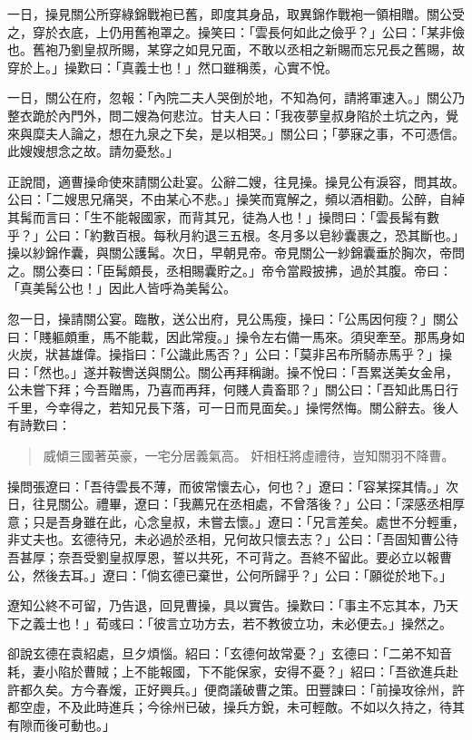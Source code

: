 一日，操見關公所穿綠錦戰袍已舊，即度其身品，取異錦作戰袍一領相贈。關公受之，穿於衣底，上仍用舊袍罩之。操笑曰：「雲長何如此之儉乎？」公曰：「某非儉也。舊袍乃劉皇叔所賜，某穿之如見兄面，不敢以丞相之新賜而忘兄長之舊賜，故穿於上。」操歎曰：「真義士也！」然口雖稱羨，心實不悅。

一日，關公在府，忽報：「內院二夫人哭倒於地，不知為何，請將軍速入。」關公乃整衣跪於內門外，問二嫂為何悲泣。甘夫人曰：「我夜夢皇叔身陷於土坑之內，覺來與糜夫人論之，想在九泉之下矣，是以相哭。」關公曰；「夢寐之事，不可憑信。此嫂嫂想念之故。請勿憂愁。」

正說間，適曹操命使來請關公赴宴。公辭二嫂，往見操。操見公有淚容，問其故。公曰：「二嫂思兄痛哭，不由某心不悲。」操笑而寬解之，頻以酒相勸。公醉，自綽其髯而言曰：「生不能報國家，而背其兄，徒為人也！」操問曰：「雲長髯有數乎？」公曰：「約數百根。每秋月約退三五根。冬月多以皂紗囊裹之，恐其斷也。」操以紗錦作囊，與關公護髯。次日，早朝見帝。帝見關公一紗錦囊垂於胸次，帝問之。關公奏曰：「臣髯頗長，丞相賜囊貯之。」帝令當殿披拂，過於其腹。帝曰：「真美髯公也！」因此人皆呼為美髯公。

忽一日，操請關公宴。臨散，送公出府，見公馬瘦，操曰：「公馬因何瘦？」關公曰：「賤軀頗重，馬不能載，因此常瘦。」操令左右備一馬來。須臾牽至。那馬身如火炭，狀甚雄偉。操指曰：「公識此馬否？」公曰：「莫非呂布所騎赤馬乎？」操曰：「然也。」遂并鞍轡送與關公。關公再拜稱謝。操不悅曰：「吾累送美女金帛，公未嘗下拜；今吾贈馬，乃喜而再拜，何賤人貴畜耶？」關公曰：「吾知此馬日行千里，今幸得之，若知兄長下落，可一日而見面矣。」操愕然悔。關公辭去。後人有詩歎曰：

\begin{quote}
威傾三國著英豪，一宅分居義氣高。
奸相枉將虛禮待，豈知關羽不降曹。
\end{quote}

操問張遼曰：「吾待雲長不薄，而彼常懷去心，何也？」遼曰：「容某探其情。」次日，往見關公。禮畢，遼曰：「我薦兄在丞相處，不曾落後？」公曰：「深感丞相厚意；只是吾身雖在此，心念皇叔，未嘗去懷。」遼曰：「兄言差矣。處世不分輕重，非丈夫也。玄德待兄，未必過於丞相，兄何故只懷去志？」公曰：「吾固知曹公待吾甚厚；奈吾受劉皇叔厚恩，誓以共死，不可背之。吾終不留此。要必立以報曹公，然後去耳。」遼曰：「倘玄德已棄世，公何所歸乎？」公曰：「願從於地下。」

遼知公終不可留，乃告退，回見曹操，具以實告。操歎曰：「事主不忘其本，乃天下之義士也！」荀彧曰：「彼言立功方去，若不教彼立功，未必便去。」操然之。

卻說玄德在袁紹處，旦夕煩惱。紹曰：「玄德何故常憂？」玄德曰：「二弟不知音耗，妻小陷於曹賊；上不能報國，下不能保家，安得不憂？」紹曰：「吾欲進兵赴許都久矣。方今春煖，正好興兵。」便商議破曹之策。田豐諫曰：「前操攻徐州，許都空虛，不及此時進兵；今徐州已破，操兵方銳，未可輕敵。不如以久持之，待其有隙而後可動也。」

